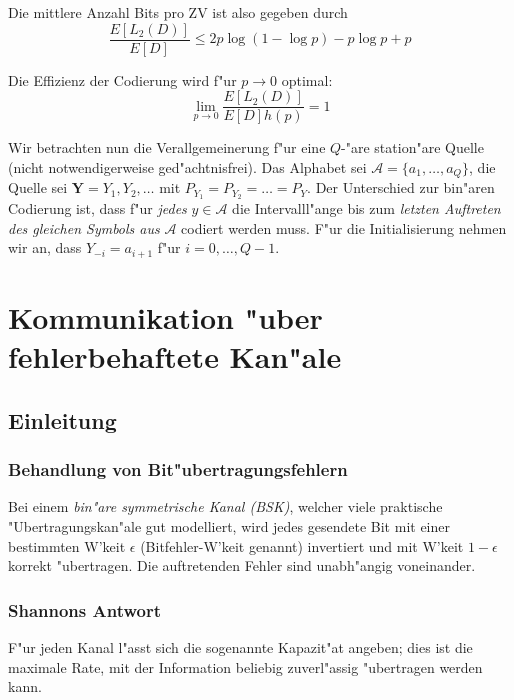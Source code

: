 \documentclass[german, 10pt, a4paper, twocolumn]{scrartcl}
\begin{document}
Die mittlere Anzahl Bits pro ZV ist also gegeben durch
\begin{displaymath}
	\frac{E[L_2(D)]}{E[D]} \leq 2p\log(1-\log p) - p \log p + p
\end{displaymath}

Die Effizienz der Codierung wird f"ur $p\to 0$ optimal:
\begin{displaymath}	
	\lim_{p \to 0} \frac{E[L_2(D)]}{E[D]h(p)}=1
\end{displaymath}

Wir betrachten nun die Verallgemeinerung f"ur eine $Q$-"are station"are Quelle (nicht notwendigerweise ged"achtnisfrei). Das Alphabet sei $\mathcal{A}=\{a_1,\ldots,a_Q\}$, die Quelle sei $\mathbf{Y}=Y_1,Y_2,\ldots$ mit $P_{Y_1}=P_{Y_2}=\ldots=P_Y$. Der Unterschied zur bin"aren Codierung ist, dass f"ur \textit{jedes} $y \in \mathcal{A}$ die Intervalll"ange bis zum \textit{letzten Auftreten des gleichen Symbols aus} $\mathcal{A}$ codiert werden muss. F"ur die Initialisierung nehmen wir an, dass $Y_{-i}=a_{i+1}$ f"ur $i=0,\ldots,Q-1$.

\section{Kommunikation "uber fehlerbehaftete Kan"ale}

\subsection{Einleitung}

\subsubsection{Behandlung von Bit"ubertragungsfehlern}

Bei einem \textit{bin"are symmetrische Kanal (BSK)}, welcher viele praktische "Ubertragungskan"ale gut modelliert, wird jedes gesendete Bit mit einer bestimmten W'keit $\epsilon$ (Bitfehler-W'keit genannt) invertiert und mit W'keit $1-\epsilon$ korrekt "ubertragen. Die auftretenden Fehler sind unabh"angig voneinander.

\subsubsection{Shannons Antwort}

F"ur jeden Kanal l"asst sich die sogenannte Kapazit"at angeben; dies ist die maximale Rate, mit der Information beliebig zuverl"assig "ubertragen werden kann.
\end{document}
